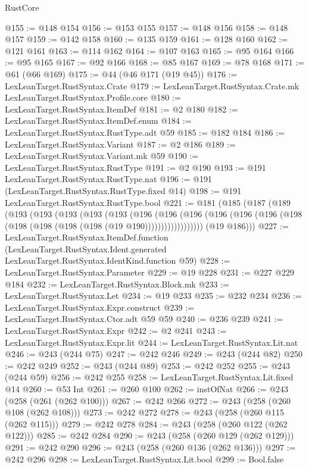 \begin{lexlean}{RustCore}
\begin{coremodule}
@155 := @148 @154
@156 := @153 @155
@157 := @148 @156
@158 := @148 @157
@159 := @142 @158
@160 := @135 @159
@161 := @128 @160
@162 := @121 @161
@163 := @114 @162
@164 := @107 @163
@165 := @95 @164
@166 := @95 @165
@167 := @92 @166
@168 := @85 @167
@169 := @78 @168
@171 := @61 (@66 @169)
@175 := @44 (@46 @171 (@19 @45))
@176 := LexLeanTarget.RustSyntax.Crate
@179 := LexLeanTarget.RustSyntax.Crate.mk LexLeanTarget.RustSyntax.Profile.core
@180 := LexLeanTarget.RustSyntax.ItemDef
@181 := @2 @180
@182 := LexLeanTarget.RustSyntax.ItemDef.enum
@184 := LexLeanTarget.RustSyntax.RustType.adt @59
@185 := @182 @184
@186 := LexLeanTarget.RustSyntax.Variant
@187 := @2 @186
@189 := LexLeanTarget.RustSyntax.Variant.mk @59
@190 := LexLeanTarget.RustSyntax.RustType
@191 := @2 @190
@193 := @191 LexLeanTarget.RustSyntax.RustType.nat
@196 := @191 (LexLeanTarget.RustSyntax.RustType.fixed @14)
@198 := @191 LexLeanTarget.RustSyntax.RustType.bool
@221 := @181
    (@185
      (@187
        (@189
          (@193
            (@193
              (@193
                (@193
                  (@193
                    (@196
                      (@196
                        (@196
                          (@196
                            (@196 (@196 (@198 (@198 (@198 (@198 (@198 (@19 @190))))))))))))))))))
        (@19 @186)))
@227 := LexLeanTarget.RustSyntax.ItemDef.function
    (LexLeanTarget.RustSyntax.Ident.generated LexLeanTarget.RustSyntax.IdentKind.function @59)
@228 := LexLeanTarget.RustSyntax.Parameter
@229 := @19 @228
@231 := @227 @229 @184
@232 := LexLeanTarget.RustSyntax.Block.mk
@233 := LexLeanTarget.RustSyntax.Let
@234 := @19 @233
@235 := @232 @234
@236 := LexLeanTarget.RustSyntax.Expr.construct
@239 := LexLeanTarget.RustSyntax.Ctor.adt @59 @59
@240 := @236 @239
@241 := LexLeanTarget.RustSyntax.Expr
@242 := @2 @241
@243 := LexLeanTarget.RustSyntax.Expr.lit
@244 := LexLeanTarget.RustSyntax.Lit.nat
@246 := @243 (@244 @75)
@247 := @242 @246
@249 := @243 (@244 @82)
@250 := @242 @249
@252 := @243 (@244 @89)
@253 := @242 @252
@255 := @243 (@244 @59)
@256 := @242 @255
@258 := LexLeanTarget.RustSyntax.Lit.fixed @14
@260 := @53 Int
@261 := @260 @100
@262 := instOfNat
@266 := @243 (@258 (@261 (@262 @100)))
@267 := @242 @266
@272 := @243 (@258 (@260 @108 (@262 @108)))
@273 := @242 @272
@278 := @243 (@258 (@260 @115 (@262 @115)))
@279 := @242 @278
@284 := @243 (@258 (@260 @122 (@262 @122)))
@285 := @242 @284
@290 := @243 (@258 (@260 @129 (@262 @129)))
@291 := @242 @290
@296 := @243 (@258 (@260 @136 (@262 @136)))
@297 := @242 @296
@298 := LexLeanTarget.RustSyntax.Lit.bool
@299 := Bool.false

\end{coremodule}
\end{lexlean}
